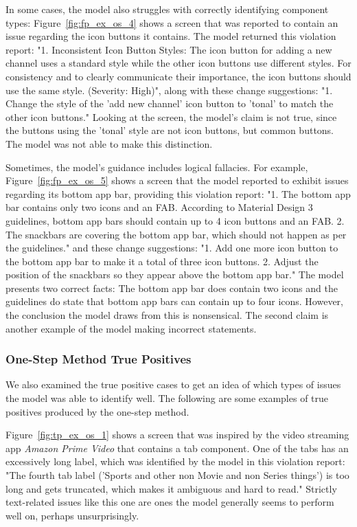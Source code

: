 \documentclass[11pt,titlepage,oneside,openany]{book}
\begin{document}
In some cases, the model also struggles with correctly identifying component types: Figure~\ref{fig:fp_ex_os_4} shows a screen that was reported to contain an issue regarding the icon buttons it contains. The model returned this violation report: "1. Inconsistent Icon Button Styles: The icon button for adding a new channel uses a standard style while the other icon buttons use different styles. For consistency and to clearly communicate their importance, the icon buttons should use the same style. (Severity: High)", along with these change suggestions: "1. Change the style of the 'add new channel' icon button to 'tonal' to match the other icon buttons." Looking at the screen, the model's claim is not true, since the buttons using the 'tonal' style are not icon buttons, but common buttons. The model was not able to make this distinction. 

Sometimes, the model's guidance includes logical fallacies. For example, Figure~\ref{fig:fp_ex_os_5} shows a screen that the model reported to exhibit issues regarding its bottom app bar, providing this violation report: "1. The bottom app bar contains only two icons and an FAB. According to Material Design 3 guidelines, bottom app bars should contain up to 4 icon buttons and an FAB. 2. The snackbars are covering the bottom app bar, which should not happen as per the guidelines." and these change suggestions: "1. Add one more icon button to the bottom app bar to make it a total of three icon buttons. 2. Adjust the position of the snackbars so they appear above the bottom app bar." The model presents two correct facts: The bottom app bar does contain two icons and the guidelines do state that bottom app bars can contain up to four icons. However, the conclusion the model draws from this is nonsensical. The second claim is another example of the model making incorrect statements.

\subsubsection{One-Step Method True Positives}

We also examined the true positive cases to get an idea of which types of issues the model was able to identify well. The following are some examples of true positives produced by the one-step method. 

Figure~\ref{fig:tp_ex_os_1} shows a screen that was inspired by the video streaming app \emph{Amazon Prime Video} \cite{noauthor_amazon_nodate} that contains a tab component. One of the tabs has an excessively long label, which was identified by the model in this violation report: "The fourth tab label ('Sports and other non Movie and non Series things') is too long and gets truncated, which makes it ambiguous and hard to read." Strictly text-related issues like this one are ones the model generally seems to perform well on, perhaps unsurprisingly. 
\end{document}
